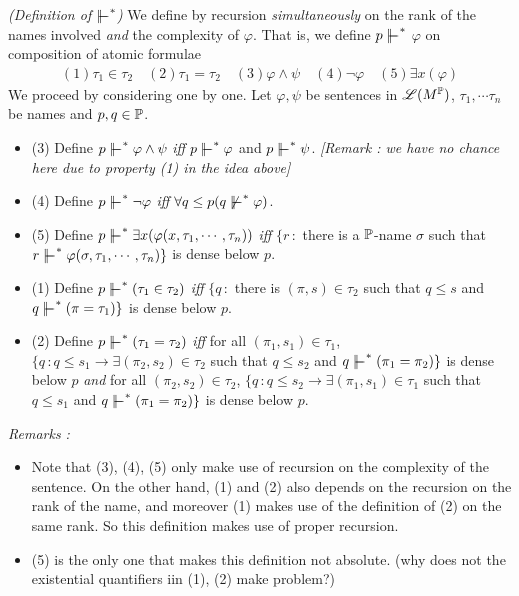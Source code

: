 \documentclass[12pt,a4paper]{article}
\renewenvironment{i}
{\begin{itemize} 
	}%
	{\end{itemize}
}
\begin{document}
 \emph{(Definition of $\forces^*$)} We define by recursion \emph{simultaneously} on the rank of the names involved \emph{and} the complexity of $\varphi$. That is, we define $p\forces^*$ $\varphi$ on composition of atomic formulae
\begin{align*}
(1) \tau_1 \in \tau_2 \quad (2) \tau_1 = \tau_2 \quad (3) \varphi \wedge \psi \quad (4) \neg \varphi \quad (5) \exists x(\varphi)
\end{align*} 
We proceed by considering one by one. Let $\varphi, \psi$ be sentences in $\mathscr{L}(M^{\mathbb{P}})$, $\tau_1, \cdots \tau_n$ be names and $p, q\in \mathbb{P}$.
\begin{i}
\item[(3)] Define $p\forces^* \varphi\wedge \psi$ \emph{iff} $p\forces^* \varphi$ and $p\forces^* \psi$. \emph{[Remark : we have no chance here due to property (1) in the idea above]}
\item[(4)] Define $p\forces^* \neg \varphi$ \emph{iff} $\forall q\leq p (q\not\forces^* \varphi)$.
\item[(5)] Define $p\forces^* \exists x(\varphi(x, \tau_1, \cdots, \tau_n))$ \emph{iff} $\{r\,:$ there is a $\mathbb{P}$-name $\sigma$ such that $r\forces^* \varphi(\sigma, \tau_1, \cdots, \tau_n) \}$ is dense below $p$.
\item[(1)] Define $p\forces^* (\tau_1 \in \tau_2)$ \emph{iff} $\{ q\, :$ there is $(\pi, s) \in \tau_2$ such that $q\leq s$ and $q\forces^* (\pi = \tau_1) \}$ is dense below $p$.
\item[(2)] Define $p\forces^* (\tau_1 = \tau_2)$ \emph{iff} for all $(\pi_1, s_1) \in \tau_1$, $\{q \, : q\leq s_1 \rightarrow \exists(\pi_2, s_2) \in \tau_2$ such that $q\leq  s_2$ and $q\forces^* (\pi_1 = \pi_2) \}$ is dense below $p$ \emph{and} for all $(\pi_2, s_2) \in \tau_2$, $\{q \,: q\leq s_2 \rightarrow \exists (\pi_1, s_1) \in \tau_1$ such that $q\leq s_1$ and $q\forces^* (\pi_1 = \pi_2)\}$ is dense below $p$.
\end{i}
\emph{Remarks :}
\begin{i}
\item Note that (3), (4), (5) only make use of recursion on the complexity of the sentence. On the other hand, (1) and (2) also depends on the recursion on the rank of the name, and moreover (1) makes use of the definition of (2) on the same rank. So this definition makes use of proper recursion.
\item (5) is the only one that makes this definition not absolute. (why does not the existential quantifiers iin (1), (2) make problem?)
\end{i}
\s
\end{document}
